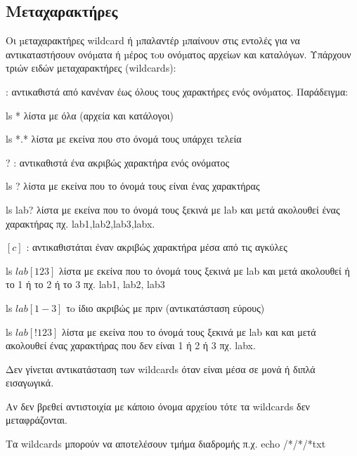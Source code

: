 \subsection{Μεταχαρακτήρες}

Oι µεταχαρακτήρες wildcard ή µπαλαντέρ µπαίνουν στις εντολές για να αντικαταστήσουν ονόµατα ή µέρος τoυ ονόµατος αρχείων και καταλόγων.
Υπάρχουν τριών ειδών μεταχαρακτήρες (wildcards):

\begin{packed_item}
  \item * : αντικαθιστά από κανέναν έως όλους τους χαρακτήρες ενός ονόµατος. Παράδειγμα:
        \begin{packed_item}
            \item ls * λίστα με όλα (αρχεία και κατάλογοι)
            \item ls *.* λίστα με εκείνα που στο όνομά τους υπάρχει τελεία
            \end{packed_item}
  \item ? : αντικαθιστά ένα ακριβώς χαρακτήρα ενός ονόματος
        \begin{packed_item}
            \item ls ? λίστα με εκείνα που το όνομά τους είναι ένας χαρακτήρας
            \item ls lab? λίστα με εκείνα που το όνομά τους ξεκινά με lab και μετά ακολουθεί ένας χαρακτήρας πχ. lab1,lab2,lab3,labx.
            \end{packed_item}
  \item $[c]$ : αντικαθιστάται έναν ακριβώς χαρακτήρα μέσα από τις αγκύλες
        \begin{packed_item}
            \item ls $lab[123]$ λίστα με εκείνα που το όνομά τους  ξεκινά με lab και μετά ακολουθεί ή το 1 ή το 2 ή το 3 πχ. lab1, lab2, lab3
            \item ls $lab[1-3]$ τo ίδιο ακριβώς με πριν (αντικατάσταση εύρους)
            \item ls $lab[!123]$ λίστα με εκείνα που το όνομά τους ξεκινά με lab και και μετά ακολουθεί ένας χαρακτήρας που δεν είναι 1 ή  2 ή 3 πχ. labx. 
            \end{packed_item}
  \item Δεν γίνεται αντικατάσταση των wildcards όταν είναι μέσα σε μονά ή διπλά εισαγωγικά.   
  \item Aν δεν βρεθεί αντιστοιχία με κάποιο όνομα αρχείου τότε τα wildcards δεν μεταφράζονται.
  \item Τα wildcards μπορούν να αποτελέσουν τμήμα διαδρομής π.χ. echo /*/*/*txt       
\end{packed_item}

